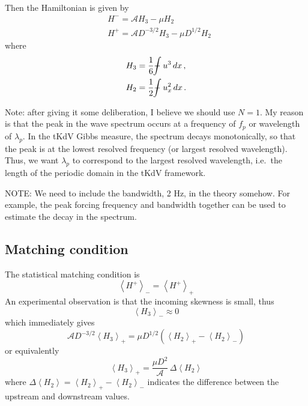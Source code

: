\documentclass[11pt]{article}
\newcommand{\vsp}[1]{\vspace{#1 pc} \noindent}
\newcommand{\mean}[1]{\left< #1 \right>}
\newcommand{\lamfac}{N}
\newcommand{\ampp}{\mathcal{A}}
\newcommand{\Hp}{H^{+}}
\newcommand{\Hm}{H^{-}}
\newcommand{\meanup}[1]{\mean{#1}_{-}}
\newcommand{\meandn}[1]{\mean{#1}_{+}}
\def\Xint#1{\mathchoice
   {\XXint\displaystyle\textstyle{#1}}%
   {\XXint\textstyle\scriptstyle{#1}}%
   {\XXint\scriptstyle\scriptscriptstyle{#1}}%
   {\XXint\scriptscriptstyle\scriptscriptstyle{#1}}%
   \!\int}
\def\XXint#1#2#3{{\setbox0=\hbox{$#1{#2#3}{\int}$}
     \vcenter{\hbox{$#2#3$}}\kern-.5\wd0}}
\def\dashint{\Xint-}
\newcommand{\intt}{\dashint}%
\newcommand{\dx}{\, dx}
\begin{document}
\vsp{10}


Then the Hamiltonian is given by
\begin{align}
\label{Hamiltonian}
& \Hm = \ampp H_3 - \mu H_2 \\
& \Hp = \ampp D^{-3/2} H_3 - \mu D^{1/2} H_2
\end{align}
where
\begin{align}
&H_3 = \frac{1}{6} \intt u^3 \dx	\, , \\
&H_2 = \frac{1}{2} \intt u_x^2 \dx	\, .
\end{align}

Note: after giving it some deliberation, I believe we should use $\lamfac=1$. My reason is that the peak in the wave spectrum occurs at a frequency of $f_p$ or wavelength of $\lambda_p$. In the tKdV Gibbs measure, the spectrum decays monotonically, so that the peak is at the lowest resolved frequency (or largest resolved wavelength). Thus, we want $\lambda_p$ to correspond to the largest resolved wavelength, i.e.~the length of the periodic domain in the tKdV framework.


NOTE: We need to include the bandwidth, 2 Hz, in the theory somehow. For example, the peak forcing frequency and bandwidth together can be used to estimate the decay in the spectrum.

\subsection{Matching condition}

The statistical matching condition is
\begin{equation}
\meanup{\Hp} = \meandn{\Hp}
\end{equation}
An experimental observation is that the incoming skewness is small, thus
\begin{equation}
\meanup{H_3} \approx 0
\end{equation}
which immediately gives
\begin{equation}
\ampp D^{-3/2} \meandn{H_3} = \mu D^{1/2} \left( \meandn{H_2} - \meanup{H_2} \right)
\end{equation}
or equivalently
\begin{equation}
\label{H3H2}
\meandn{H_3} = \frac{\mu D^{2}}{\ampp} \, \Delta \mean{H_2}
\end{equation}
where $\Delta \mean{H_2} =  \meandn{H_2} - \meanup{H_2}$  indicates the difference between the upstream and downstream values.
\end{document}
